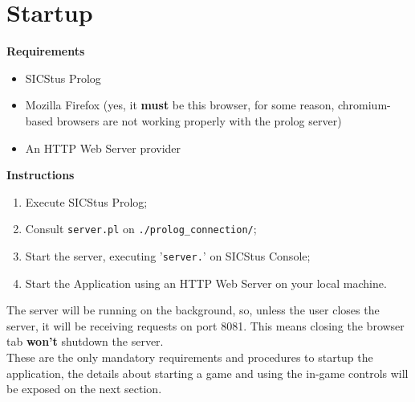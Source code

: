 \section{Startup}

\textbf{Requirements}
\begin{itemize}
    \item SICStus Prolog
    \item Mozilla Firefox (yes, it \textbf{must} be this browser, for some reason, chromium-based browsers are not working properly with the prolog server)
    \item An HTTP Web Server provider
\end{itemize}

\noindent \textbf{Instructions}
\begin{enumerate}
    \item Execute SICStus Prolog;
    \item Consult \verb+server.pl+ on \verb+./prolog_connection/+;
    \item Start the server, executing '\verb+server.+' on SICStus Console;
    \item Start the Application using an HTTP Web Server on your local machine.
\end{enumerate}

\noindent The server will be running on the background, so, unless the user closes the server, it will be receiving 
requests on port 8081.
This means closing the browser tab \textbf{won't} shutdown the server.\\
\noindent These are the only mandatory requirements and procedures to startup the application, the details about starting a game and using the in-game controls
will be exposed on the next section.
